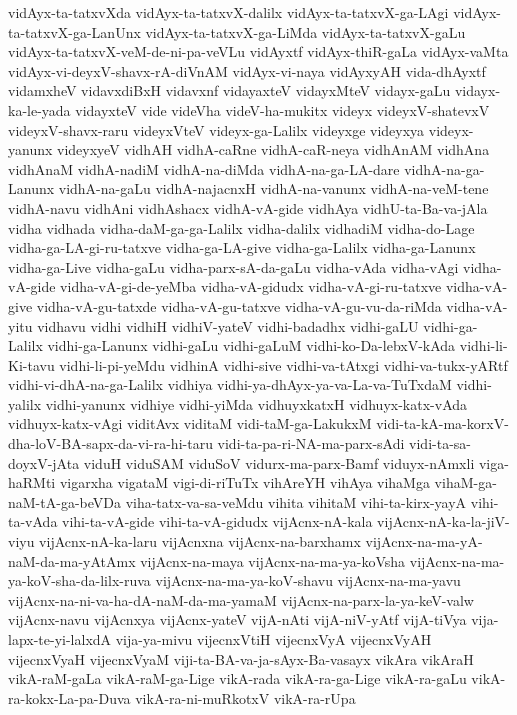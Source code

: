 {vidAyx-ta-tatxvXda
vidAyx-ta-tatxvX-dalilx
vidAyx-ta-tatxvX-ga-LAgi
vidAyx-ta-tatxvX-ga-LanUnx
vidAyx-ta-tatxvX-ga-LiMda
vidAyx-ta-tatxvX-gaLu
vidAyx-ta-tatxvX-veM-de-ni-pa-veVLu
vidAyxtf
vidAyx-thiR-gaLa
vidAyx-vaMta
vidAyx-vi-deyxV-shavx-rA-diVnAM
vidAyx-vi-naya
vidAyxyAH
vida-dhAyxtf
vidamxheV
vidavxdiBxH
vidavxnf
vidayaxteV
vidayxMteV
vidayx-gaLu
vidayx-ka-le-yada
vidayxteV
vide
videVha
videV-ha-mukitx
videyx
videyxV-shatevxV
videyxV-shavx-raru
videyxVteV
videyx-ga-Lalilx
videyxge
videyxya
videyx-yanunx
videyxyeV
vidhAH
vidhA-caRne
vidhA-caR-neya
vidhAnAM
vidhAna
vidhAnaM
vidhA-nadiM
vidhA-na-diMda
vidhA-na-ga-LA-dare
vidhA-na-ga-Lanunx
vidhA-na-gaLu
vidhA-najacnxH
vidhA-na-vanunx
vidhA-na-veM-tene
vidhA-navu
vidhAni
vidhAshacx
vidhA-vA-gide
vidhAya
vidhU-ta-Ba-va-jAla
vidha
vidhada
vidha-daM-ga-ga-Lalilx
vidha-dalilx
vidhadiM
vidha-do-Lage
vidha-ga-LA-gi-ru-tatxve
vidha-ga-LA-give
vidha-ga-Lalilx
vidha-ga-Lanunx
vidha-ga-Live
vidha-gaLu
vidha-parx-sA-da-gaLu
vidha-vAda
vidha-vAgi
vidha-vA-gide
vidha-vA-gi-de-yeMba
vidha-vA-gidudx
vidha-vA-gi-ru-tatxve
vidha-vA-give
vidha-vA-gu-tatxde
vidha-vA-gu-tatxve
vidha-vA-gu-vu-da-riMda
vidha-vA-yitu
vidhavu
vidhi
vidhiH
vidhiV-yateV
vidhi-badadhx
vidhi-gaLU
vidhi-ga-Lalilx
vidhi-ga-Lanunx
vidhi-gaLu
vidhi-gaLuM
vidhi-ko-Da-lebxV-kAda
vidhi-li-Ki-tavu
vidhi-li-pi-yeMdu
vidhinA
vidhi-sive
vidhi-va-tAtxgi
vidhi-va-tukx-yARtf
vidhi-vi-dhA-na-ga-Lalilx
vidhiya
vidhi-ya-dhAyx-ya-va-La-va-TuTxdaM
vidhi-yalilx
vidhi-yanunx
vidhiye
vidhi-yiMda
vidhuyxkatxH
vidhuyx-katx-vAda
vidhuyx-katx-vAgi
viditAvx
viditaM
vidi-taM-ga-LakukxM
vidi-ta-kA-ma-korxV-dha-loV-BA-sapx-da-vi-ra-hi-taru
vidi-ta-pa-ri-NA-ma-parx-sAdi
vidi-ta-sa-doyxV-jAta
viduH
viduSAM
viduSoV
vidurx-ma-parx-Bamf
viduyx-nAmxli
viga-haRMti
vigarxha
vigataM
vigi-di-riTuTx
vihAreYH
vihAya
vihaMga
vihaM-ga-naM-tA-ga-beVDa
viha-tatx-va-sa-veMdu
vihita
vihitaM
vihi-ta-kirx-yayA
vihi-ta-vAda
vihi-ta-vA-gide
vihi-ta-vA-gidudx
vijAcnx-nA-kala
vijAcnx-nA-ka-la-jiV-viyu
vijAcnx-nA-ka-laru
vijAcnxna
vijAcnx-na-barxhamx
vijAcnx-na-ma-yA-naM-da-ma-yAtAmx
vijAcnx-na-maya
vijAcnx-na-ma-ya-koVsha
vijAcnx-na-ma-ya-koV-sha-da-lilx-ruva
vijAcnx-na-ma-ya-koV-shavu
vijAcnx-na-ma-yavu
vijAcnx-na-ni-va-ha-dA-naM-da-ma-yamaM
vijAcnx-na-parx-la-ya-keV-valw
vijAcnx-navu
vijAcnxya
vijAcnx-yateV
vijA-nAti
vijA-niV-yAtf
vijA-tiVya
vija-lapx-te-yi-lalxdA
vija-ya-mivu
vijecnxVtiH
vijecnxVyA
vijecnxVyAH
vijecnxVyaH
vijecnxVyaM
viji-ta-BA-va-ja-sAyx-Ba-vasayx
vikAra
vikAraH
vikA-raM-gaLa
vikA-raM-ga-Lige
vikA-rada
vikA-ra-ga-Lige
vikA-ra-gaLu
vikA-ra-kokx-La-pa-Duva
vikA-ra-ni-muRkotxV
vikA-ra-rUpa
}
